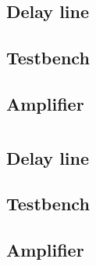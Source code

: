 \section{Delay line}

\section{Testbench}

\section{Amplifier}





\chapter{}

\section{Delay line}

\section{Testbench}

\section{Amplifier}

\chapter{}

\chapter{}